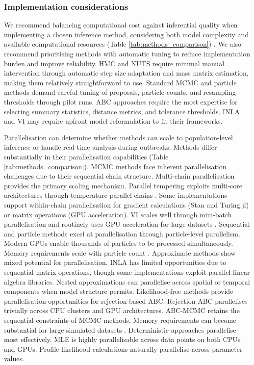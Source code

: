 \documentclass{article}
\begin{document}
\subsubsection{Implementation considerations}

We recommend balancing computational cost against inferential quality when implementing a chosen inference method, considering both model complexity and available computational resources (Table \ref{tab:methods_comparison}) \citep{funk2020choices}.
We also recommend prioritising methods with automatic tuning to reduce implementation burden and improve reliability.
HMC and NUTS require minimal manual intervention through automatic step size adaptation and mass matrix estimation, making them relatively straightforward to use.
Standard MCMC and particle methods demand careful tuning of proposals, particle counts, and resampling thresholds through pilot runs.
ABC approaches require the most expertise for selecting summary statistics, distance metrics, and tolerance thresholds.
INLA and VI may require upfront model reformulation to fit their frameworks.

Parallelisation can determine whether methods can scale to population-level inference or handle real-time analysis during outbreaks.
Methods differ substantially in their parallelisation capabilities (Table \ref{tab:methods_comparison}).
MCMC methods face inherent parallelisation challenges due to their sequential chain structure.
Multi-chain parallelisation provides the primary scaling mechanism.
Parallel tempering exploits multi-core architectures through temperature-parallel chains \citep{surjanovic2023pigeons}.
Some implementations support within-chain parallelisation for gradient calculations (Stan and Turing.jl) or matrix operations (GPU acceleration).
VI scales well through mini-batch parallelisation and routinely uses GPU acceleration for large datasets \citep{hoffman2013stochastic, Abbott2021-delta}.
Sequential and particle methods excel at parallelisation through particle-level parallelism.
Modern GPUs enable thousands of particles to be processed simultaneously.
Memory requirements scale with particle count \citep{henriksen2012parallel}.
Approximate methods show mixed potential for parallelisation.
INLA has limited opportunities due to sequential matrix operations, though some implementations exploit parallel linear algebra libraries.
Nested approximations can parallelise across spatial or temporal components when model structure permits.
Likelihood-free methods provide parallelisation opportunities for rejection-based ABC.
Rejection ABC parallelises trivially across CPU clusters and GPU architectures.
ABC-MCMC retains the sequential constraints of MCMC methods.
Memory requirements can become substantial for large simulated datasets \citep{kulkarni2022hardware}.
Deterministic approaches parallelise most effectively.
MLE is highly parallelisable across data points on both CPUs and GPUs.
Profile likelihood calculations naturally parallelise across parameter values.
\end{document}

